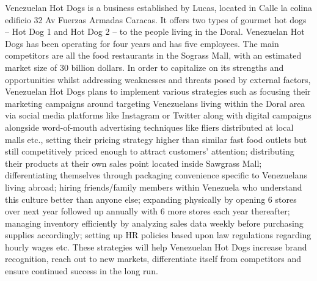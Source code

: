  

Venezuelan Hot Dogs is a business established by Lucas, located in Calle la colina edificio 32 Av Fuerzas Armadas Caracas. It offers two types of gourmet hot dogs – Hot Dog 1 and Hot Dog 2 – to the people living in the Doral. Venezuelan Hot Dogs has been operating for four years and has five employees. The main competitors are all the food restaurants in the Sograss Mall, with an estimated market size of 30 billion dollars. In order to capitalize on its strengths and opportunities whilst addressing weaknesses and threats posed by external factors, Venezuelan Hot Dogs plans to implement various strategies such as focusing their marketing campaigns around targeting Venezuelans living within the Doral area via social media platforms like Instagram or Twitter along with digital campaigns alongside word-of-mouth advertising techniques like fliers distributed at local malls etc., setting their pricing strategy higher than similar fast food outlets but still competitively priced enough to attract customers’ attention; distributing their products at their own sales point located inside Sawgrass Mall; differentiating themselves through packaging convenience specific to Venezuelans living abroad; hiring friends/family members within Venezuela who understand this culture better than anyone else; expanding physically by opening 6 stores over next year followed up annually with 6 more stores each year thereafter; managing inventory efficiently by analyzing sales data weekly before purchasing supplies accordingly; setting up HR policies based upon law regulations regarding hourly wages etc. These strategies will help Venezuelan Hot Dogs increase brand recognition, reach out to new markets, differentiate itself from competitors and ensure continued success in the long run.